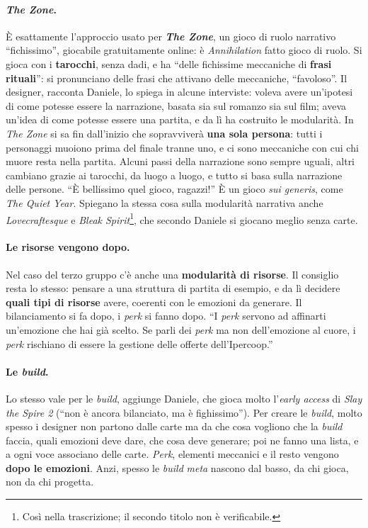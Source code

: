 \paragraph{\emph{The Zone}.} È esattamente l'approccio usato per \textbf{\emph{The Zone}},
un gioco di ruolo narrativo ``fichissimo'', giocabile gratuitamente online: è
\emph{Annihilation} fatto gioco di ruolo. Si gioca con i \textbf{tarocchi}, senza dadi, e
ha ``delle fichissime meccaniche di \textbf{frasi rituali}'': si pronunciano delle frasi
che attivano delle meccaniche, ``favoloso''. Il designer, racconta Daniele, lo spiega in
alcune interviste: voleva avere un'ipotesi di come potesse essere la narrazione, basata
sia sul romanzo sia sul film; aveva un'idea di come potesse essere una partita, e da lì
ha costruito le modularità. In \emph{The Zone} si sa fin dall'inizio che sopravviverà
\textbf{una sola persona}: tutti i personaggi muoiono prima del finale tranne uno, e ci
sono meccaniche con cui chi muore resta nella partita. Alcuni passi della narrazione sono
sempre uguali, altri cambiano grazie ai tarocchi, da luogo a luogo, e tutto si basa sulla
narrazione delle persone. ``È bellissimo quel gioco, ragazzi!'' È un gioco \emph{sui
generis}, come \emph{The Quiet Year}. Spiegano la stessa cosa sulla modularità narrativa
anche \emph{Lovecraftesque} e \emph{Bleak Spirit}\footnote{Così nella trascrizione; il
secondo titolo non è verificabile.}, che secondo Daniele si giocano meglio senza carte.

\paragraph{Le risorse vengono dopo.} Nel caso del terzo gruppo c'è anche una
\textbf{modularità di risorse}. Il consiglio resta lo stesso: pensare a una struttura di
partita di esempio, e da lì decidere \textbf{quali tipi di risorse} avere, coerenti con
le emozioni da generare. Il bilanciamento si fa dopo, i \emph{perk} si fanno dopo. ``I
\emph{perk} servono ad affinarti un'emozione che hai già scelto. Se parli dei \emph{perk}
ma non dell'emozione al cuore, i \emph{perk} rischiano di essere la gestione delle offerte
dell'Ipercoop.''

\paragraph{Le \emph{build}.} Lo stesso vale per le \emph{build}, aggiunge Daniele, che gioca
molto l'\emph{early access} di \emph{Slay the Spire 2} (``non è ancora bilanciato, ma è
fighissimo''). Per creare le \emph{build}, molto spesso i designer non partono dalle carte
ma da che cosa vogliono che la \emph{build} faccia, quali emozioni deve dare, che cosa
deve generare; poi ne fanno una lista, e a ogni voce associano delle carte. \emph{Perk},
elementi meccanici e il resto vengono \textbf{dopo le emozioni}. Anzi, spesso le
\emph{build} \emph{meta} nascono dal basso, da chi gioca, non da chi progetta.

